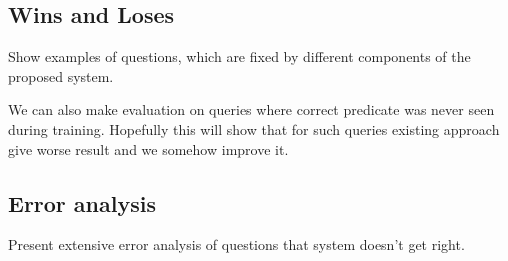 
\subsection{Wins and Loses}

Show examples of questions, which are fixed by different components of the proposed system.

We can also make evaluation on queries where correct predicate was never seen during training. Hopefully this will show that for such queries existing approach give worse result and we somehow improve it.

\subsection{Error analysis}

Present extensive error analysis of questions that system doesn't get right.
